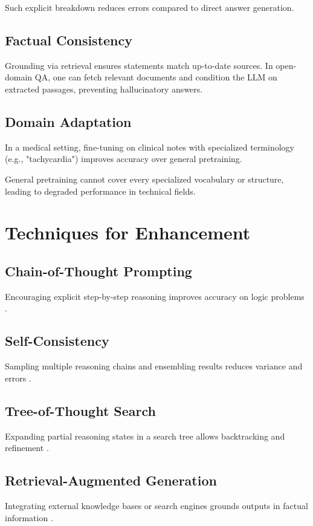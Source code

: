 \documentclass[12pt]{article}
\begin{document}
Such explicit breakdown reduces errors compared to direct answer generation.

\subsection{Factual Consistency}
Grounding via retrieval ensures statements match up-to-date sources. In open-domain QA, one can fetch relevant documents and condition the LLM on extracted passages, preventing hallucinatory answers.

\subsection{Domain Adaptation}
In a medical setting, fine-tuning on clinical notes with specialized terminology (e.g., "tachycardia") improves accuracy over general pretraining.

General pretraining cannot cover every specialized vocabulary or structure, leading to degraded performance in technical fields.

\section{Techniques for Enhancement}
\subsection{Chain-of-Thought Prompting}
Encouraging explicit step-by-step reasoning improves accuracy on logic problems \cite{wei2022chain}.

\subsection{Self-Consistency}
Sampling multiple reasoning chains and ensembling results reduces variance and errors \cite{wang2022self}.

\subsection{Tree-of-Thought Search}
Expanding partial reasoning states in a search tree allows backtracking and refinement \cite{yao2023tree}.

\subsection{Retrieval-Augmented Generation}
Integrating external knowledge bases or search engines grounds outputs in factual information \cite{lewis2020retrieval}.
\end{document}
